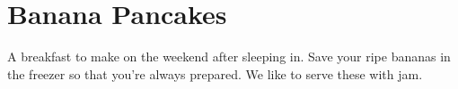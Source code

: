 \section{Banana Pancakes}

\begin{recipestats}[
        servings=12 pancakes,
        preptime=10 \minute,
        source=Mike \& Jane,
    ]
\end{recipestats}

\begin{recipeabstract}
    A breakfast to make on the weekend after sleeping in.
    Save your ripe bananas in the freezer so that you're always prepared.
    We like to serve these with jam.
\end{recipeabstract}

\begin{ingredientcolumns}
    \begin{ingredientblock}
        \\
        \\
        \\
        \\
    \end{ingredientblock}

    \begin{ingredientblock}
        \\
        \\
        \\
    \end{ingredientblock}
\end{ingredientcolumns}

